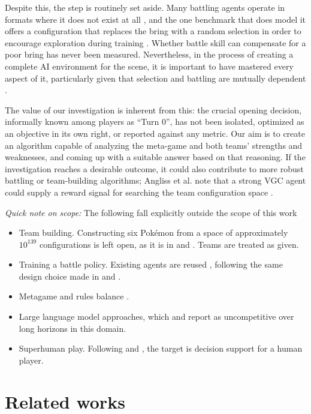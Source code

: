 \documentclass[conference]{IEEEtran}
\begin{document}
Despite this, the step is routinely set aside. Many battling agents operate in
formats where it does not exist at all \cite{simoes2020, huang2019,
grigsby2025}, and the one benchmark that does model it offers a configuration
that replaces the bring with a random selection in order to encourage
exploration during training \cite{angliss2026}. Whether battle skill can
compensate for a poor bring has never been measured. Nevertheless, in the
process of creating a complete AI environment for the scene, it is important to
have mastered every aspect of it, particularly given that selection and
battling are mutually dependent \cite{reis2021}.

The value of our investigation is inherent from this: the crucial opening
decision, informally known among players as ``Turn 0'', has not been isolated,
optimized as an objective in its own right, or reported against any metric. Our
aim is to create an algorithm capable of analyzing the meta-game and both
teams' strengths and weaknesses, and coming up with a suitable answer based on
that reasoning. If the investigation reaches a desirable outcome, it could also
contribute to more robust battling or team-building algorithms; Angliss et al.
note that a strong VGC agent could supply a reward signal for searching the team
configuration space \cite{angliss2026}.

\emph{Quick note on scope:} The following fall explicitly outside the scope of this work
\begin{itemize}
\item {Team building.} Constructing six Pok\'emon from a space of
approximately $10^{139}$ configurations \cite{angliss2026} is left open, as it
is in \cite{angliss2026} and \cite{reis2021}. Teams are treated as given.
\item{Training a battle policy.} Existing agents are reused
\cite{grigsby2025, angliss2026, karten2026}, following the same design choice
made in \cite{reis2024} and \cite{reis2025}.
\item{Metagame and rules balance} \cite{reis2021, reis2024, reis2025, hu2024}.
\item{Large language model approaches}, which \cite{karten2026} and
\cite{grigsby2025} report as uncompetitive over long horizons in this domain.
\item{Superhuman play.} Following \cite{li2025} and \cite{rodriguez2024},
the target is decision support for a human player.
\end{itemize}
\section{Related works}
\end{document}
